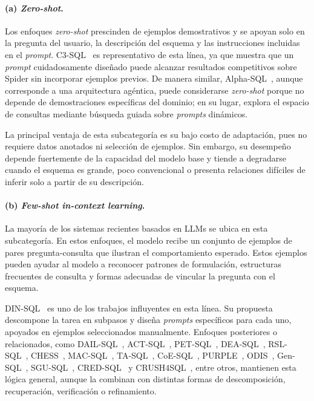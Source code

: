 \paragraph{(a) \emph{Zero-shot}.} 
Los enfoques \emph{zero-shot} prescinden de ejemplos demostrativos y se apoyan solo en la pregunta del usuario, la descripción del esquema y las instrucciones incluidas en el \emph{prompt}. C3-SQL~\cite{C3-SQL2023} es representativo de esta línea, ya que muestra que un \emph{prompt} cuidadosamente diseñado puede alcanzar resultados competitivos sobre Spider sin incorporar ejemplos previos. De manera similar, Alpha-SQL~\cite{Alpha-SQL2025}, aunque corresponde a una arquitectura agéntica, puede considerarse \emph{zero-shot} porque no depende de demostraciones específicas del dominio; en su lugar, explora el espacio de consultas mediante búsqueda guiada sobre \emph{prompts} dinámicos.

La principal ventaja de esta subcategoría es su bajo costo de adaptación, pues no requiere datos anotados ni selección de ejemplos. Sin embargo, su desempeño depende fuertemente de la capacidad del modelo base y tiende a degradarse cuando el esquema es grande, poco convencional o presenta relaciones difíciles de inferir solo a partir de su descripción.

\paragraph{(b) \emph{Few-shot in-context learning}.} 
La mayoría de los sistemas recientes basados en \acp{LLM} se ubica en esta subcategoría. En estos enfoques, el modelo recibe un conjunto de ejemplos de pares pregunta-consulta que ilustran el comportamiento esperado. Estos ejemplos pueden ayudar al modelo a reconocer patrones de formulación, estructuras frecuentes de consulta y formas adecuadas de vincular la pregunta con el esquema.

DIN-SQL~\cite{DIN-SQL2023} es uno de los trabajos influyentes en esta línea. Su propuesta descompone la tarea en subpasos y diseña \emph{prompts} específicos para cada uno, apoyados en ejemplos seleccionados manualmente. Enfoques posteriores o relacionados, como DAIL-SQL~\cite{DAIL-SQL2023}, ACT-SQL~\cite{ACT-SQL2023}, PET-SQL~\cite{PET-SQL2024}, DEA-SQL~\cite{DEA-SQL2024}, RSL-SQL~\cite{RSL-SQL2024}, CHESS~\cite{CHESS2024}, MAC-SQL~\cite{MAC-SQL2023}, TA-SQL~\cite{TA-SQL2024}, CoE-SQL~\cite{CoE-SQL2024}, PURPLE~\cite{PURPLE2024}, ODIS~\cite{ODIS2023}, Gen-SQL~\cite{Gen-SQL2025}, SGU-SQL~\cite{SGU-SQL2025}, CRED-SQL~\cite{CRED-SQL2025} y CRUSH4SQL~\cite{CRUSH4SQL2023}, entre otros, mantienen esta lógica general, aunque la combinan con distintas formas de descomposición, recuperación, verificación o refinamiento.

